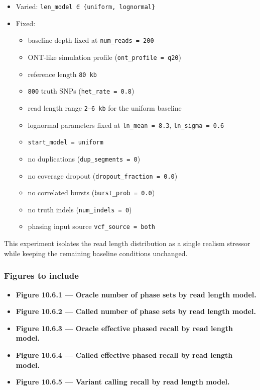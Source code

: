 \documentclass[
]{article}
\providecommand{\tightlist}{%
  \setlength{\itemsep}{0pt}\setlength{\parskip}{0pt}}
\begin{document}
\begin{itemize}
\tightlist
\item
  Varied: \texttt{len\_model\ ∈\ \{uniform,\ lognormal\}}
\item
  Fixed:

  \begin{itemize}
  \tightlist
  \item
    baseline depth fixed at \texttt{num\_reads\ =\ 200}
  \item
    ONT-like simulation profile (\texttt{ont\_profile\ =\ q20})
  \item
    reference length \texttt{80\ kb}
  \item
    \texttt{800} truth SNPs (\texttt{het\_rate\ =\ 0.8})
  \item
    read length range \texttt{2–6\ kb} for the uniform baseline
  \item
    lognormal parameters fixed at \texttt{ln\_mean\ =\ 8.3},
    \texttt{ln\_sigma\ =\ 0.6}
  \item
    \texttt{start\_model\ =\ uniform}
  \item
    no duplications (\texttt{dup\_segments\ =\ 0})
  \item
    no coverage dropout (\texttt{dropout\_fraction\ =\ 0.0})
  \item
    no correlated bursts (\texttt{burst\_prob\ =\ 0.0})
  \item
    no truth indels (\texttt{num\_indels\ =\ 0})
  \item
    phasing input source \texttt{vcf\_source\ =\ both}
  \end{itemize}
\end{itemize}

This experiment isolates the read length distribution as a single
realism stressor while keeping the remaining baseline conditions
unchanged.

\subsubsection{Figures to include}\label{figures-to-include-4}

\begin{itemize}
\tightlist
\item
  \textbf{Figure 10.6.1 --- Oracle number of phase sets by read length
  model.}
\item
  \textbf{Figure 10.6.2 --- Called number of phase sets by read length
  model.}
\item
  \textbf{Figure 10.6.3 --- Oracle effective phased recall by read
  length model.}
\item
  \textbf{Figure 10.6.4 --- Called effective phased recall by read
  length model.}
\item
  \textbf{Figure 10.6.5 --- Variant calling recall by read length
  model.}
\end{itemize}
\end{document}
